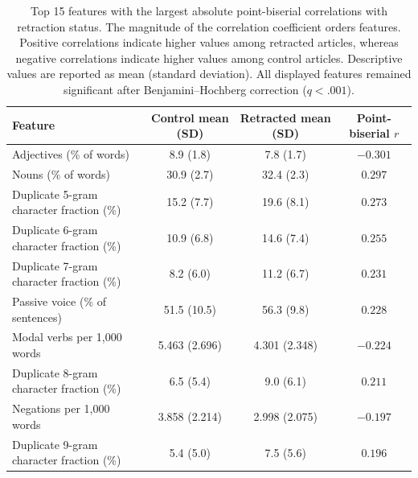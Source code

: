 \documentclass[11pt,letterpaper]{article}
\begin{document}
\begin{table}[t]
\centering
\caption{Top 15 features with the largest absolute point-biserial correlations with retraction status. The magnitude of the correlation coefficient orders features. Positive correlations indicate higher values among retracted articles, whereas negative correlations indicate higher values among control articles. Descriptive values are reported as mean (standard deviation). All displayed features remained significant after Benjamini--Hochberg correction ($q < .001$).}
\label{tab:top-feature-results}

\small
\setlength{\tabcolsep}{6pt}

\begin{tabularx}{\textwidth}{@{}Xccc@{}}
\toprule
Feature &
Control mean (SD) &
Retracted mean (SD) &
Point-biserial $r$ \\
\midrule

Adjectives (\% of words)
    & 8.9 (1.8)
    & 7.8 (1.7)
    & $-0.301$ \\

Nouns (\% of words)
    & 30.9 (2.7)
    & 32.4 (2.3)
    & $0.297$ \\

Duplicate 5-gram character fraction (\%)
    & 15.2 (7.7)
    & 19.6 (8.1)
    & $0.273$ \\

Duplicate 6-gram character fraction (\%)
    & 10.9 (6.8)
    & 14.6 (7.4)
    & $0.255$ \\

Duplicate 7-gram character fraction (\%)
    & 8.2 (6.0)
    & 11.2 (6.7)
    & $0.231$ \\

Passive voice (\% of sentences)
    & 51.5 (10.5)
    & 56.3 (9.8)
    & $0.228$ \\

Modal verbs per 1,000 words
    & 5.463 (2.696)
    & 4.301 (2.348)
    & $-0.224$ \\

Duplicate 8-gram character fraction (\%)
    & 6.5 (5.4)
    & 9.0 (6.1)
    & $0.211$ \\

Negations per 1,000 words
    & 3.858 (2.214)
    & 2.998 (2.075)
    & $-0.197$ \\

Duplicate 9-gram character fraction (\%)
    & 5.4 (5.0)
    & 7.5 (5.6)
    & $0.196$ \\


\end{tabularx}
\end{table}
\end{document}
